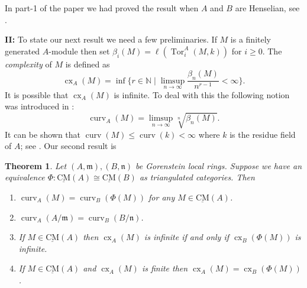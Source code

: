 \documentclass{amsart}
\newcommand{\n}{\mathfrak{n} }
\newcommand{\m}{\mathfrak{m} }
\newcommand{\rt}{\rightarrow}
\newcommand{\cx}{\operatorname{cx}}
\newcommand{\curv}{\operatorname{curv}}
\newcommand{\CMS}{\operatorname{\underline{CM}}}
\newcommand{\Tor}{\operatorname{Tor}}
\theoremstyle{plain}
\newtheorem{theorem}{Theorem}[section]
\theoremstyle{definition}
\theoremstyle{remark}
\begin{document}
{In part-1 of the paper we had proved the result when $A$ and $B$ are Henselian, see \cite[1.4]{P-stable}.






\textbf{II:} To state our next result we need a few preliminaries. If $M$ is a finitely generated  $A$-module then set $\beta_i(M) = \ell(\Tor^A_i(M,k))$ for $i \geq 0$. The \emph{complexity} of $M$ is defined as
$$\cx_A(M) = \inf\{ r \in \mathbb{N} \mid  \limsup_{n \rt \infty} \frac{\beta_n(M)}{n^{r - 1}}  < \infty \}.$$
It is possible that $\cx_A(M)$ is infinite. To deal with this the following notion was introduced in \cite{A-ext}:
$$\curv_A(M) = \limsup_{n \rt \infty} \sqrt[n]{\beta_n(M)}.$$
It can be shown that $\curv(M) \leq \curv(k) < \infty$ where $k$ is the residue field of $A$; see \cite[4.2.3, 4.2.4]{A}. Our second result is
\begin{theorem}
\label{second}Let $(A,\m), (B,\n) $ be  Gorenstein local rings. Suppose we have an equivalence $\Phi \colon \CMS(A) \cong \CMS(B)$ as triangulated categories. Then
\begin{enumerate}[\rm (1)]
  \item $\curv_A(M) = \curv_B(\Phi(M))$ for any $M \in \CMS(A)$.
  \item $\curv_A(A/\m) = \curv_B(B/\n)$.
  \item If $M \in \CMS(A)$ then $\cx_A(M)$ is infinite if and only if $\cx_B(\Phi(M))$ is infinite.
  \item If $M \in \CMS(A)$ and $\cx_A(M)$ is finite then $\cx_A(M) = \cx_B(\Phi(M))$.
\end{enumerate}
\end{theorem}


}
\end{document}
